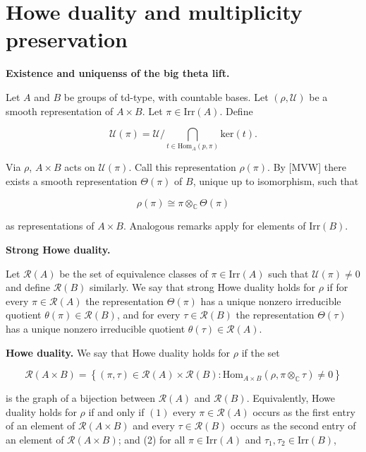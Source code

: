 \documentclass[12pt]{article}
\begin{document}
\section{Howe duality and multiplicity preservation}

\textbf{Existence and uniquenss of the big theta lift.}

Let $A$ and $B$ be groups of td-type, with countable bases. Let $\left(\rho,
\mathcal{U}\right)$ be a smooth representation of $A \times B$. Let $\pi \in
\text{Irr}\left(A\right)$. Define 

\[\mathcal{U}\left(\pi\right) = \mathcal{U} / \bigcap_{t \in
\text{Hom}_{A}\left(p, \pi\right)} \text{ker}\left(t\right).\]

Via $\rho$, $A \times B$ acts on $\mathcal{U}\left(\pi\right)$. Call this
representation $\rho\left(\pi\right)$. By [MVW] there exists a smooth
representation $\Theta\left(\pi\right)$ of $B$, unique up to isomorphism, such
that 

\[\rho\left(\pi\right) \cong \pi \otimes_{\mathbb{C}} \Theta\left(\pi\right)\]

as representations of $A \times B$. Analogous remarks apply for elements of
$\text{Irr}\left(B\right)$.

\textbf{Strong Howe duality.}

Let $\mathcal{R}\left(A\right)$ be the set of equivalence classes of $\pi \in
\text{Irr}\left(A\right)$ such that $\mathcal{U}\left(\pi\right) \neq 0$ and
define $\mathcal{R}\left(B\right)$ similarly. We say that strong Howe duality
holds for $\rho$ if for every $\pi \in \mathcal{R}\left(A\right)$ the
representation $\Theta\left(\pi\right)$ has a unique nonzero irreducible
quotient $\theta\left(\pi\right) \in \mathcal{R}\left(B\right)$, and for every
$\tau \in \mathcal{R}\left(B\right)$ the representation
$\Theta\left(\tau\right)$ has a unique nonzero irreducible quotient
$\theta\left(\tau\right) \in \mathcal{R}\left(A\right)$.

\textbf{Howe duality.} We say that Howe duality holds for $\rho$ if the set 

\[\mathcal{R}\left(A \times B\right) = \left\{\left(\pi, \tau\right) \in
\mathcal{R}\left(A\right) \times \mathcal{R}\left(B\right) : \text{Hom}_{A
\times B}\left(\rho, \pi \otimes_{\mathbb{C}} \tau\right) \neq 0\right\}\]

is the graph of a bijection between $\mathcal{R}\left(A\right)$ and
$\mathcal{R}\left(B\right)$. Equivalently, Howe duality holds for $\rho$ if and
only if $(1)$ every $\pi \in \mathcal{R}\left(A\right)$ occurs as the first
entry of an element of $\mathcal{R}\left(A \times B\right)$ and every $\tau \in
\mathcal{R}\left(B\right)$ occurs as the second entry of an element of
$\mathcal{R}\left(A \times B\right)$; and (2) for all $\pi \in
\text{Irr}\left(A\right)$ and $\tau_1, \tau_2 \in \text{Irr}\left(B\right)$, 
\end{document}
